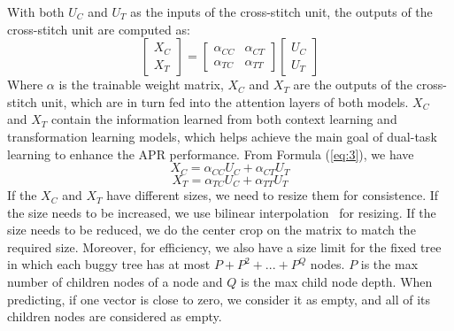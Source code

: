 With both $U_C$ and $U_T$ as the inputs of the cross-stitch unit, the
outputs of the cross-stitch unit are computed as:
\begin{equation}\label{eq:3}
	\begin{bmatrix}
		X_C\\
		X_T
	\end{bmatrix}
	=
	\begin{bmatrix}
		\alpha_{CC} &  \alpha_{CT} \\
		\alpha_{TC} &  \alpha_{TT}
	\end{bmatrix}
	\begin{bmatrix}
		U_C\\
		U_T
	\end{bmatrix}
\end{equation}
Where $\alpha$ is the trainable weight matrix, $X_C$ and $X_T$ are the
outputs of the cross-stitch unit, which are in turn fed into the
attention layers of both models. $X_C$ and $X_T$ contain the
information learned from both context learning and transformation
learning models, which helps achieve the main goal of dual-task learning
to enhance the APR performance. From Formula (\ref{eq:3}), we have
\begin{equation}\label{eq:4}
	X_C = \alpha_{CC}U_C + \alpha_{CT}U_T
\end{equation}
\begin{equation}\label{eq:5}
	X_T = \alpha_{TC}U_C + \alpha_{TT}U_T
\end{equation}
If the $X_C$ and $X_T$ have different sizes, we need to resize them
for consistence. If the size needs to be increased, we use bilinear
interpolation~\cite{bilinear-interpolation} for resizing. If the size
needs to be reduced, we do the center crop on the matrix to match the
required size. Moreover, for efficiency, we also have a size limit for
the fixed tree in which each buggy tree has at most $P+P^2+...+P^Q$
nodes.  $P$ is the max number of children nodes of a node and $Q$ is
the max child node depth. When predicting, if one vector is close
to zero, we consider it as empty, and all of its children nodes are
considered as empty.


